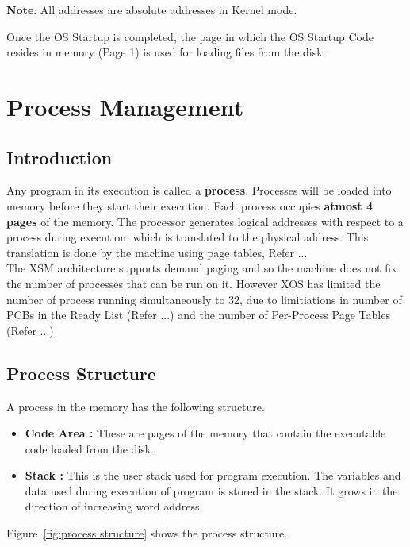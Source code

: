 \documentclass[10pt]{report}
\begin{document}
\textbf{Note}: All addresses are absolute addresses in Kernel mode. 

Once the OS Startup is completed, the page in which the OS Startup Code resides in memory (Page 1) is used for loading files from the disk.


\chapter{Process Management}
\label{chp:process}

\section{Introduction}
Any program in its execution is called a \textbf{process}. Processes will be loaded into memory before they start their execution. Each process occupies \textbf{atmost 4 pages} of the memory. The processor generates logical addresses with respect to a process during execution, which is translated to the physical address. This translation is done by the machine using page tables, Refer ... \\ 

The XSM architecture supports demand paging and so the machine does not fix the number of processes that can be run on it. However XOS has limited the number of process running simultaneously to 32, due to limitiations in number of PCBs in the Ready List (Refer ...) and the number of Per-Process Page Tables (Refer ...)\\




\section{Process Structure}
A process in the memory has the following structure.
\begin{itemize}
	\item \textbf{Code Area :}  These are pages of the memory that contain the executable code loaded from the disk. 
	\item \textbf{Stack :} This is the user stack used for program execution. The variables and data used during execution of program is stored in the stack. It grows in the direction of increasing word address.
\end{itemize}

Figure~\ref{fig:process structure} shows the process structure. \\
\end{document}
